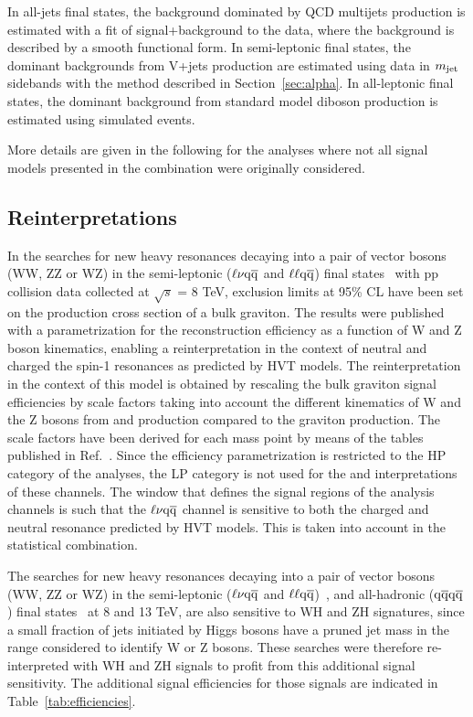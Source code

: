 In all-jets final states, the background dominated by QCD multijets production is estimated with a fit of signal+background to the data, where the background is described by a smooth functional form.
In semi-leptonic final states, the dominant backgrounds from V+jets production are estimated using data in $m_{\text{jet}}$ sidebands with the method described in Section~\ref{sec:alpha}.
In all-leptonic final states, the dominant background from standard model diboson production is estimated using simulated events.

More details are given in the following for the analyses where not all signal models presented in the combination were originally considered.

\subsection{Reinterpretations}

In the searches for new heavy resonances decaying into a pair of vector bosons (WW, ZZ or WZ) in the semi-leptonic ($\ell \nu \mathrm{q}\overline{\mathrm{q}}$ and $\ell\ell \mathrm{q}\overline{\mathrm{q}}$) final states~\cite{Khachatryan:2014gha} with pp collision data collected at $\sqrt{s}$ = 8 TeV, exclusion limits at 95\% CL have been set on the production cross section of a bulk graviton.
The results were published with a parametrization for the reconstruction efficiency as a function of W and Z boson kinematics, enabling a reinterpretation in the context of neutral and charged the spin-1 resonances as predicted by HVT models.
The reinterpretation in the context of this model is obtained by rescaling the bulk graviton signal efficiencies by scale factors taking into account the different kinematics of W and the Z bosons from \PWpr{} and \cPZpr{} production compared to the graviton production.
The scale factors have been derived for each mass point by means of the tables published in Ref.~\cite{Khachatryan:2014gha}.
Since the efficiency parametrization is restricted to the HP category of the analyses, the LP category is not used for the \PWpr{} and \cPZpr{} interpretations of these channels.
The \mJ window that defines the signal regions of the analysis channels is such that the $\ell \nu \mathrm{q}\overline{\mathrm{q}}$ channel is sensitive to both the charged and neutral resonance predicted by HVT models. This is taken into account in the statistical combination.

The searches for new heavy resonances decaying into a pair of vector bosons (WW, ZZ or WZ) in the semi-leptonic ($\ell \nu \mathrm{q}\overline{\mathrm{q}}$ and $\ell\ell \mathrm{q}\overline{\mathrm{q}}$)~\cite{Khachatryan:2014gha,Khachatryan:2014gha,CMS-PAS-EXO-15-002}, and all-hadronic ($\mathrm{q}\overline{\mathrm{q}} \mathrm{q}\overline{\mathrm{q}}$) final states~\cite{Khachatryan:2014hpa,CMS-PAS-EXO-15-002} at 8 and 13 TeV, are also sensitive to WH and ZH signatures, since a small fraction of jets initiated by Higgs bosons have a pruned jet mass in the range considered to identify W or Z bosons.
These searches were therefore re-interpreted with WH and ZH signals to profit from this additional signal sensitivity.
The additional signal efficiencies for those signals are indicated in Table~\ref{tab:efficiencies}.

